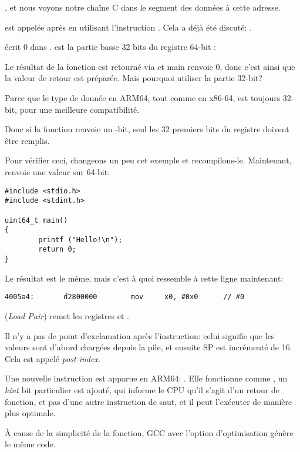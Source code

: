 , et nous voyons notre chaîne C  dans le  segment
des données à cette adresse.


\puts est appelée après en utilisant l'instruction . Cela a déjà été discuté: .

\MOV écrit 0 dans .
 est la partie basse 32 bits du registre 64-bit :



Le résultat de la fonction est retourné via  et main renvoie 0, donc c'est ainsi que la valeur
de retour est préparée.
Mais pourquoi utiliser la partie 32-bit?

Parce que le type de donnée \Tint en ARM64, tout comme en x86-64, est toujours 32-bit, pour une
meilleure compatibilité.

Donc si la fonction renvoie un -bit, seul les 32 premiers bits du registre  doivent
être remplis.

Pour vérifier ceci, changeons un peu cet exemple et recompilons-le.
Maintenant, \main renvoie une valeur sur 64-bit:

\begin{lstlisting}[caption=\main renvoie une valeur de type \TT{uint64\_t} type,style=customc]
#include <stdio.h>
#include <stdint.h>

uint64_t main()
{
        printf ("Hello!\n");
        return 0;
}
\end{lstlisting}

Le résultat est le même, mais c'est à quoi ressemble \MOV à cette ligne maintenant:

\begin{lstlisting}[caption=GCC 4.8.1 \NonOptimizing + objdump]
  4005a4:       d2800000        mov     x0, #0x0      // #0
\end{lstlisting}


 (\emph{Load Pair}) remet les registres  et .

Il n'y a pas de point d'exclamation après l'instruction: celui signifie que les valeurs sont
d'abord chargées depuis la pile, et ensuite \ac{SP} est incrémenté de 16.
Cela est appelé \emph{post-index}.

Une nouvelle instruction est apparue en ARM64: \RET.
Elle fonctionne comme , un \emph{hint} bit particulier est ajouté, qui informe le \ac{CPU}
qu'il s'agit d'un retour de fonction, et pas d'une autre instruction de saut, et il peut l'exécuter
de manière plus optimale. 

À cause de la simplicité de la fonction, GCC avec l'option d'optimisation génère le même code.

